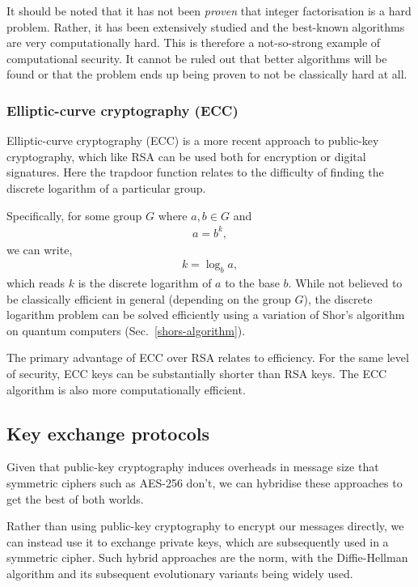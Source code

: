 It should be noted that it has not been \emph{proven} that integer factorisation is a hard problem. Rather, it has been extensively studied and the best-known algorithms are very computationally hard. This is therefore a not-so-strong example of computational security. It cannot be ruled out that better algorithms will be found or that the problem ends up being proven to not be classically hard at all.

\subsubsection{Elliptic-curve cryptography (ECC)} \label{elliptic-curve-cryptography-ecc}

Elliptic-curve cryptography (ECC) is a more recent approach to public-key cryptography, which like RSA can be used both for encryption or digital signatures. Here the trapdoor function relates to the difficulty of finding the discrete logarithm of a particular group.

Specifically, for some group $G$ where $a,b\in G$ and
\begin{align}
a=b^k,
\end{align}
we can write,
\begin{align}
k=\log_b a,
\end{align}
which reads $k$ is the discrete logarithm of $a$ to the base $b$. While not believed to be classically efficient in general (depending on the group $G$), the discrete logarithm problem can be solved efficiently using a variation of Shor's algorithm on quantum computers (Sec.~\ref{shors-algorithm}).

The primary advantage of ECC over RSA relates to efficiency. For the same level of security, ECC keys can be substantially shorter than RSA keys. The ECC algorithm is also more computationally efficient.

\subsection{Key exchange protocols} \label{key-exchange-protocols}

Given that public-key cryptography induces overheads in message size that symmetric ciphers such as AES-256 don't, we can hybridise these approaches to get the best of both worlds.

Rather than using public-key cryptography to encrypt our messages directly, we can instead use it to exchange private keys, which are subsequently used in a symmetric cipher. Such hybrid approaches are the norm, with the Diffie-Hellman algorithm \cite{bib:DiffieHellman} and its subsequent evolutionary variants being widely used.


